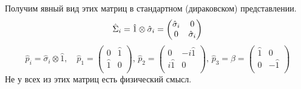 Получим явный вид этих матриц в стандартном (дираковском) представлении.
$$
    \Hat \Sigma_i = \hat 1 \otimes \hat \sigma_i = \begin{pmatrix}
                                                     \hat \sigma_i & 0 \\
                                                     0 & \hat \sigma_i \\
                                                   \end{pmatrix}
$$
$$
    \hat p_i = \hat \sigma_i \otimes \hat 1, \quad
    \hat p_1 = \begin{pmatrix}
                 0 & \hat 1 \\
                 \hat 1 & 0 \\
               \end{pmatrix}, \,
    \hat p_2 = \begin{pmatrix}
                 0 & -i\hat 1 \\
                 i\hat 1 & 0 \\
               \end{pmatrix}, \,
    \hat p_3 = \hat \beta = \begin{pmatrix}
                 \hat 1 & 0 \\
                 0 & -\hat 1 \\
               \end{pmatrix}
$$
Не у всех из этих матриц есть физический смысл.

